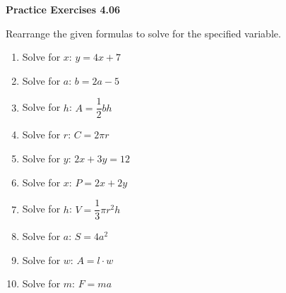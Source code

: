 \vspace{0.3ex}
\noindent\textbf{Practice Exercises 4.06}

\vspace{0.2ex}

Rearrange the given formulas to solve for the specified variable.
\begin{multicols}{2}				
\begin{enumerate}
    \item Solve for \(x\): \(y = 4x + 7\)  
    \item Solve for \(a\): \(b = 2a - 5\)  
    \item Solve for \(h\): \(A = \dfrac{1}{2} b h\)  
    \item Solve for \(r\): \(C = 2 \pi r\)  
    \item Solve for \(y\): \(2x + 3y = 12\)  
    \item Solve for \(x\): \(P = 2x + 2y\)  
    \item Solve for \(h\): \(V = \dfrac{1}{3} \pi r^2 h\)  
    \item Solve for \(a\): \(S = 4a^2\)  
    \item Solve for \(w\): \(A = l \cdot w\)  
    \item Solve for \(m\): \(F = ma\)  
\end{enumerate}
\end{multicols}
